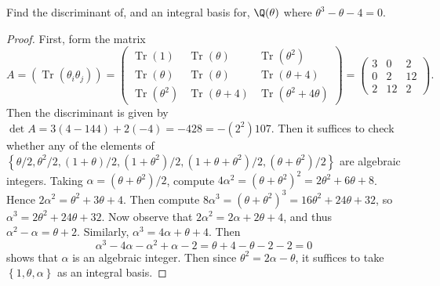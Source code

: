 \documentclass[10pt]{amsart}
\begin{document}
\setcounter{thm}{4}
\begin{thm}
  Find the discriminant of, and an integral basis for, $\Q(\theta)$ where $\theta^3 - \theta - 4 = 0$.
  \begin{proof}
    \renewcommand{\Tr}[1]{\operatorname{Tr}\left(#1\right)}
    First, form the matrix 
    $$A = \left(\Tr{\theta_i\theta_j}\right) = 
    \left(
    \begin{array}{ccc}
      \Tr{1} & \Tr{\theta} & \Tr{\theta^2}\\
      \Tr{\theta} & \Tr{\theta} & \Tr{\theta + 4}\\
      \Tr{\theta^2} & \Tr{\theta + 4} & \Tr{\theta^2 + 4\theta} 
    \end{array}
    \right)
    =
    \left(
    \begin{array}{ccc}
      3 & 0 & 2\\
      0 & 2 & 12\\
      2 & 12 & 2
    \end{array}
    \right).
    $$
    Then the discriminant is given by $\det{A} = 3(4 - 144) + 2(-4) = -428 = -(2^2)107$.
    Then it suffices to check whether any of the elements of $\left\{\theta/2, \theta^2/2, (1 + \theta)/2, (1 + \theta^2)/2, (1 + \theta + \theta^2)/2, (\theta + \theta^2)/2\right\}$ are algebraic integers.
    Taking $\alpha = (\theta + \theta^2)/2$, compute $4\alpha^2 = (\theta + \theta^2)^2 = 2\theta^2 + 6\theta + 8$.
    Hence $2\alpha^2 = \theta^2 + 3\theta + 4$.
    Then compute $8\alpha^3 = (\theta + \theta^2)^3 = 16\theta^2 + 24\theta + 32$, so $\alpha^3 = 2\theta^2 + 24\theta + 32$.
    Now observe that $2\alpha^2 = 2\alpha + 2\theta + 4$, and thus $\alpha^2 - \alpha = \theta + 2$.
    Similarly, $\alpha^3 = 4\alpha + \theta + 4$.
    Then 
    $$\alpha^3 - 4\alpha - \alpha^2 + \alpha - 2 = \theta + 4 - \theta - 2 - 2 = 0$$
    shows that $\alpha$ is an algebraic integer.
    Then since $\theta^2 = 2\alpha - \theta$, it suffices to take $\left\{1, \theta, \alpha\right\}$ as an integral basis.
  \end{proof}
\end{thm}
\end{document}
